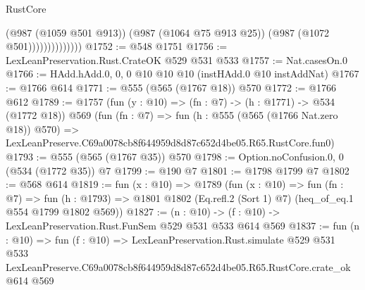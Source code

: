 \begin{lexlean}{RustCore}
\begin{coremodule}
                            (@987 (@1059 @501 @913))
                            (@987 (@1064 @75 @913 @25))
                            (@987 (@1072 @501))))))))))))))
@1752 := @548 @1751
@1756 := LexLeanPreservation.Rust.CrateOK @529 @531 @533
@1757 := Nat.casesOn.{0}
@1766 := HAdd.hAdd.{0, 0, 0} @10 @10 @10 (instHAdd.{0} @10 instAddNat)
@1767 := @1766 @614
@1771 := @555 (@565 (@1767 @18)) @570
@1772 := @1766 @612
@1789 := @1757
    (fun (y : @10) => (fn : @7) -> (h : @1771) -> @534 (@1772 @18))
    @569
    (fun (fn : @7) =>
    fun (h : @555 (@565 (@1766 Nat.zero @18)) @570) =>
    LexLeanPreserve.C69a0078cb8f644959d8d87c652d4be05.R65.RustCore.fun0)
@1793 := @555 (@565 (@1767 @35)) @570
@1798 := Option.noConfusion.{0, 0} (@534 (@1772 @35)) @7
@1799 := @190 @7
@1801 := @1798 @1799 @7
@1802 := @568 @614
@1819 := fun (x : @10) =>
  @1789
    (fun (x : @10) =>
    fun (fn : @7) =>
    fun (h : @1793) => @1801 @1802 (Eq.refl.{2} (Sort 1) @7) (heq_of_eq.{1} @554 @1799 @1802 @569))
@1827 := (n : @10) -> (f : @10) -> LexLeanPreservation.Rust.FunSem @529 @531 @533 @614 @569
@1837 := fun (n : @10) =>
  fun (f : @10) =>
  LexLeanPreservation.Rust.simulate
    @529
    @531
    @533
    LexLeanPreserve.C69a0078cb8f644959d8d87c652d4be05.R65.RustCore.crate_ok
    @614
    @569
\end{coremodule}
\end{lexlean}
